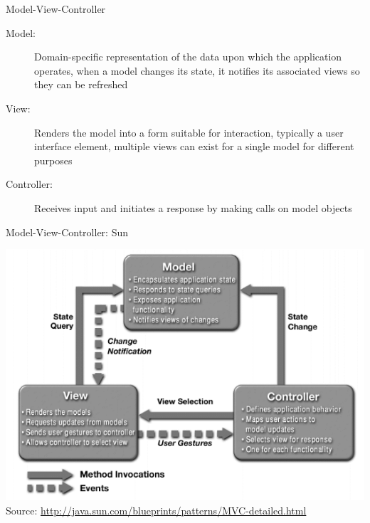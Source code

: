 \begin{frame}{Model-View-Controller}
  \begin{description}
  \item[Model:] Domain-specific representation of the data upon which
    the application operates, when a model changes its state, it
    notifies its associated views so they can be refreshed
  \item[View:] Renders the model into a form suitable for interaction,
    typically a user interface element, multiple views can exist for a
    single model for different purposes
  \item[Controller:] Receives input and initiates a response by making
    calls on model objects
  \end{description}
\end{frame}

\begin{frame}{Model-View-Controller: Sun}
  \begin{center}
    \includegraphics[scale=0.4]{figures/mvc} \\
    \tiny{Source: \url{http://java.sun.com/blueprints/patterns/MVC-detailed.html}}
  \end{center}
\end{frame}

